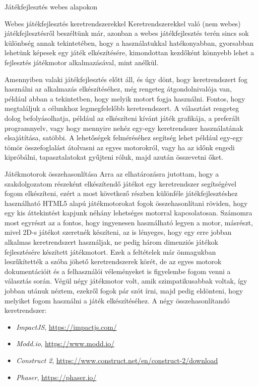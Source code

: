 \begin{MyChapter}{Játékfejlesztés webes alapokon}
\begin{MySection}{Webes játékfejlesztés keretrendszerekkel}
		Keretrendszerekkel való (nem webes) játékfejlesztésről beszéltünk már, azonban a webes játékfejlesztés terén sincs sok különbség annak tekintetében, hogy a használatukkal hatékonyabban, gyorsabban lehetünk képesek egy játék elkészítésére, kimondottan kezdőként könnyebb lehet a fejlesztés játékmotor alkalmazásával, mint anélkül.
		
		Amennyiben valaki játékfejlesztés előtt áll, és úgy dönt, hogy keretrendszert fog használni az alkalmazás elkészítéséhez, még rengeteg átgondolnivalója van, például abban a tekintetben, hogy melyik motort fogja használni. Fontos, hogy megtaláljuk a célunkhoz legmegfelelőbb keretrendszert. A választást rengeteg dolog befolyásolhatja, például az elkészíteni kívánt játék grafikája, a preferált programnyelv, vagy hogy mennyire nehéz egy-egy keretrendszer használatának elsajátítása, satöbbi. A lehetőségek felméréséhez segítség lehet például egy-egy tömör összefoglalást átolvasni az egyes motorokról, vagy ha az időnk engedi kipróbálni, tapasztalatokat gyűjteni róluk, majd azután összevetni őket.
		
		\begin{MySubSection}{Játékmotorok összehasonlítása}
			Arra az elhatározásra jutottam, hogy a szakdolgozatom részeként elkészítendő játékot egy keretrendszer segítségével fogom elkészíteni, ezért a most következő részben különféle játékfejlesztéshez használható HTML5 alapú játékmotorokat fogok összehasonlítani röviden, hogy egy kis áttekintést kapjunk néhány lehetséges motorral kapcsolatosan. Számomra most egyrészt az a fontos, hogy ingyenesen használható legyen a motor, másrészt, mivel 2D-s játékot szeretnék készíteni, az is lényeges, hogy egy erre jobban alkalmas keretrendszert használjak, ne pedig három dimenziós játékok fejlesztésére készített játékmotort. 
			Ezek a feltételek már önmagukban leszűkítették a szóba jöhető keretrendszerek körét, de az egyes motorok dokumentációit és a felhasználói véleményeket is figyelembe fogom venni a választás során. Végül négy játékmotor volt, amik szimpatikusabbak voltak, így jobban utánuk néztem, ezekről fogok pár szót írni, majd pedig eldönteni, hogy melyiket fogom használni a játék elkészítéséhez.
			\newline \newline
			A négy összehasonlítandó keretrendszer:
			
			\begin{itemize}
				\item \textit{ImpactJS}, \url{https://impactjs.com/}
				\item \textit{Modd.io}, \url{https://www.modd.io/}
				\item \textit{Construct 2}, \url{https://www.construct.net/en/construct-2/download}
				\item \textit{Phaser}, \url{https://phaser.io/}
			\end{itemize}
		\end{MySubSection}
	

\end{MySection}
\end{MyChapter}

